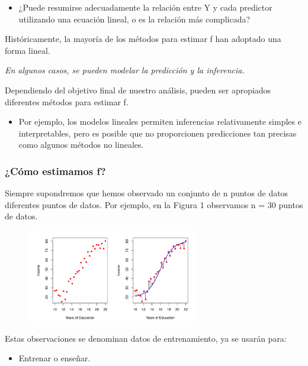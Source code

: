 \documentclass[
  letterpaper,
  DIV=11,
  numbers=noendperiod]{scrartcl}
\providecommand{\tightlist}{%
  \setlength{\itemsep}{0pt}\setlength{\parskip}{0pt}}\usepackage{longtable,booktabs,array}
\begin{document}
\begin{itemize}
\tightlist
\item
  ¿Puede resumirse adecuadamente la relación entre Y y cada predictor
  utilizando una ecuación lineal, o es la relación más complicada?
\end{itemize}

Históricamente, la mayoría de los métodos para estimar f han adoptado
una forma lineal.

\emph{En algunos casos, se pueden modelar la predicción y la
inferencia.}

Dependiendo del objetivo final de nuestro análisis, pueden ser
apropiados diferentes métodos para estimar f.

\begin{itemize}
\tightlist
\item
  Por ejemplo, los modelos lineales permiten inferencias relativamente
  simples e interpretables, pero es posible que no proporcionen
  predicciones tan precisas como algunos métodos no lineales.
\end{itemize}

\hypertarget{cuxf3mo-estimamos-f}{%
\subsubsection{\texorpdfstring{\textbf{¿Cómo estimamos
f?}}{¿Cómo estimamos f?}}\label{cuxf3mo-estimamos-f}}

Siempre supondremos que hemos observado un conjunto de n puntos de datos
diferentes puntos de datos. Por ejemplo, en la Figura 1 observamos n =
30 puntos de datos.

\begin{figure}

{\centering \includegraphics[width=2.97917in,height=\textheight]{images/figura1.png}

}

\end{figure}

Estas observaciones se denominan datos de entrenamiento, ya se usarán
para:

\begin{itemize}
\tightlist
\item
  Entrenar o enseñar.
\end{itemize}
\end{document}
